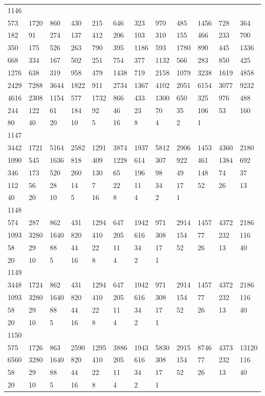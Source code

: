 \begin{longtable}{llllllllllll}
1146&&&&&&&&&&&\\
573& 1720& 860& 430& 215& 646& 323& 970& 485& 1456& 728& 364\\
182& 91& 274& 137& 412& 206& 103& 310& 155& 466& 233& 700\\
350& 175& 526& 263& 790& 395& 1186& 593& 1780& 890& 445& 1336\\
668& 334& 167& 502& 251& 754& 377& 1132& 566& 283& 850& 425\\
1276& 638& 319& 958& 479& 1438& 719& 2158& 1079& 3238& 1619& 4858\\
2429& 7288& 3644& 1822& 911& 2734& 1367& 4102& 2051& 6154& 3077& 9232\\
4616& 2308& 1154& 577& 1732& 866& 433& 1300& 650& 325& 976& 488\\
244& 122& 61& 184& 92& 46& 23& 70& 35& 106& 53& 160\\
80& 40& 20& 10& 5& 16& 8& 4& 2& 1& \\

1147&&&&&&&&&&&\\
3442& 1721& 5164& 2582& 1291& 3874& 1937& 5812& 2906& 1453& 4360& 2180\\
1090& 545& 1636& 818& 409& 1228& 614& 307& 922& 461& 1384& 692\\
346& 173& 520& 260& 130& 65& 196& 98& 49& 148& 74& 37\\
112& 56& 28& 14& 7& 22& 11& 34& 17& 52& 26& 13\\
40& 20& 10& 5& 16& 8& 4& 2& 1& \\

1148&&&&&&&&&&&\\
574& 287& 862& 431& 1294& 647& 1942& 971& 2914& 1457& 4372& 2186\\
1093& 3280& 1640& 820& 410& 205& 616& 308& 154& 77& 232& 116\\
58& 29& 88& 44& 22& 11& 34& 17& 52& 26& 13& 40\\
20& 10& 5& 16& 8& 4& 2& 1& \\

1149&&&&&&&&&&&\\
3448& 1724& 862& 431& 1294& 647& 1942& 971& 2914& 1457& 4372& 2186\\
1093& 3280& 1640& 820& 410& 205& 616& 308& 154& 77& 232& 116\\
58& 29& 88& 44& 22& 11& 34& 17& 52& 26& 13& 40\\
20& 10& 5& 16& 8& 4& 2& 1& \\

1150&&&&&&&&&&&\\
575& 1726& 863& 2590& 1295& 3886& 1943& 5830& 2915& 8746& 4373& 13120\\
6560& 3280& 1640& 820& 410& 205& 616& 308& 154& 77& 232& 116\\
58& 29& 88& 44& 22& 11& 34& 17& 52& 26& 13& 40\\
20& 10& 5& 16& 8& 4& 2& 1& \\


\end{longtable}
